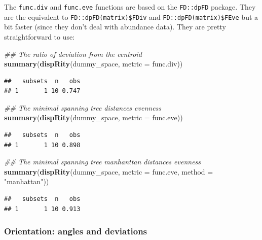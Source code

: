 \documentclass[]{book}
\newenvironment{Shaded}{\begin{snugshade}}{\end{snugshade}}
\newcommand{\CommentTok}[1]{\textcolor[rgb]{0.56,0.35,0.01}{\textit{#1}}}
\newcommand{\DataTypeTok}[1]{\textcolor[rgb]{0.13,0.29,0.53}{#1}}
\newcommand{\KeywordTok}[1]{\textcolor[rgb]{0.13,0.29,0.53}{\textbf{#1}}}
\newcommand{\NormalTok}[1]{#1}
\newcommand{\StringTok}[1]{\textcolor[rgb]{0.31,0.60,0.02}{#1}}
\begin{document}
The \texttt{func.div} and \texttt{func.eve} functions are based on the \texttt{FD::dpFD} package.
They are the equivalent to \texttt{FD::dpFD(matrix)\$FDiv} and \texttt{FD::dpFD(matrix)\$FEve} but a bit faster (since they don't deal with abundance data).
They are pretty straightforward to use:

\begin{Shaded}
\begin{Highlighting}[]
\CommentTok{## The ratio of deviation from the centroid }
\KeywordTok{summary}\NormalTok{(}\KeywordTok{dispRity}\NormalTok{(dummy_space, }\DataTypeTok{metric =}\NormalTok{ func.div))}
\end{Highlighting}
\end{Shaded}

\begin{verbatim}
##   subsets  n   obs
## 1       1 10 0.747
\end{verbatim}

\begin{Shaded}
\begin{Highlighting}[]
\CommentTok{## The minimal spanning tree distances evenness}
\KeywordTok{summary}\NormalTok{(}\KeywordTok{dispRity}\NormalTok{(dummy_space, }\DataTypeTok{metric =}\NormalTok{ func.eve))}
\end{Highlighting}
\end{Shaded}

\begin{verbatim}
##   subsets  n   obs
## 1       1 10 0.898
\end{verbatim}

\begin{Shaded}
\begin{Highlighting}[]
\CommentTok{## The minimal spanning tree manhanttan distances evenness}
\KeywordTok{summary}\NormalTok{(}\KeywordTok{dispRity}\NormalTok{(dummy_space, }\DataTypeTok{metric =}\NormalTok{ func.eve,}
                 \DataTypeTok{method =} \StringTok{"manhattan"}\NormalTok{))}
\end{Highlighting}
\end{Shaded}

\begin{verbatim}
##   subsets  n   obs
## 1       1 10 0.913
\end{verbatim}

\hypertarget{orientation-angles-and-deviations}{%
\subsubsection{Orientation: angles and deviations}\label{orientation-angles-and-deviations}}
\end{document}
